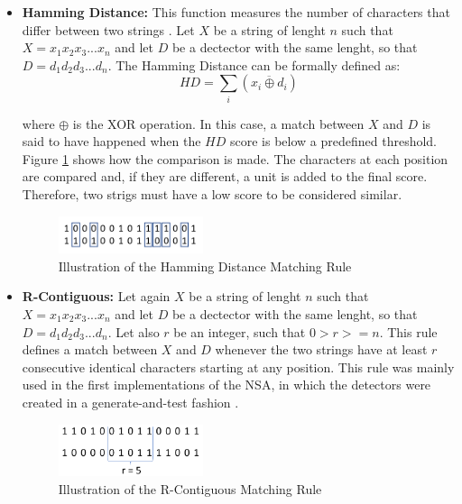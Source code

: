 \begin{itemize}
    \item \textbf{Hamming Distance:} This function measures the number of characters that differ between two strings \cite{ICBook2009}.  Let \(X\) be a string of lenght \(n\) such that \(X = x_1 x_2 x_3...x_n\) and let \(D\) be a dectector with the same lenght, so that \(D = d_1 d_2 d_3...d_n\). The Hamming Distance can be formally defined as:
    \[HD = \sum_i(\overline{x_i \oplus d_i})\]
	 
	where \( \oplus \) is the XOR operation. In this case, a match between \(X\) and \(D\) is said to have happened when the \(HD\) score is below a predefined threshold. Figure \ref{fig:hamm} shows how the comparison is made. The characters at each position are compared and, if they are different, a unit is added to the final score. Therefore, two strigs must have a low score to be considered similar.

	\begin{figure}[!h]
		\centering
		\includegraphics[width=0.4\textwidth, keepaspectratio]{img/hamming.png}
		\caption{Illustration of the Hamming Distance Matching Rule}
		\label{fig:hamm}
	\end{figure}
    
    \item \textbf{R-Contiguous:} Let again \(X\) be a string of lenght \(n\) such that \(X = x_1 x_2 x_3...x_n\) and let \(D\) be a dectector with the same lenght, so that \(D = d_1 d_2 d_3...d_n\). Let also \(r\) be an integer, such that \(0 > r >= n\). This rule defines a match between \(X\) and \(D\) whenever the two strings have at least \(r\) consecutive identical characters starting at any position. This rule was mainly used in the first implementations of the NSA, in which the detectors were created in a generate-and-test fashion \cite{EffectBinaryRule2003}.
    
	\begin{figure}[!h]
		\centering
		\includegraphics[width=0.4\textwidth, keepaspectratio]{img/rcontiguous.png}
		\caption{Illustration of the R-Contiguous Matching Rule}
		\label{fig:rcont}
	\end{figure}


\end{itemize}
